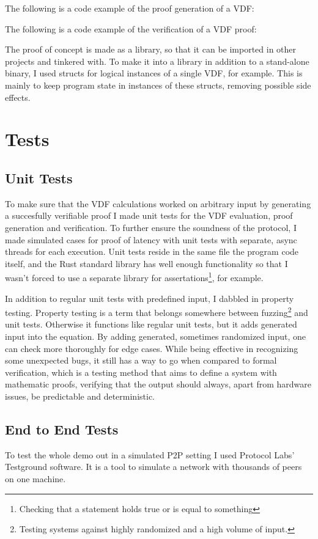 The following is a code example of the proof generation of a VDF:

The following is a code example of the verification of a VDF proof:

The proof of concept is made as a library, so that it can be imported in other projects and tinkered with. To make it into a library in addition to a stand-alone binary, I used structs for logical instances of a single VDF, for example. This is mainly to keep program state in instances of these structs, removing possible side effects.


\section{Tests}
\subsection{Unit Tests}
To make sure that the VDF calculations worked on arbitrary input by generating a succesfully verifiable proof I made unit tests for the VDF evaluation, proof generation and verification. To further ensure the soundness of the protocol, I made simulated cases for proof of latency with unit tests with separate, async threads for each execution. Unit tests reside in the same file the program code itself, and the Rust standard library has well enough functionality so that I wasn't forced to use a separate library for assertations\footnote{Checking that a statement holds true or is equal to something}, for example.

In addition to regular unit tests with predefined input, I dabbled in property testing. Property testing is a term that belongs somewhere between fuzzing\footnote{Testing systems against highly randomized and a high volume of input.} and unit tests. Otherwise it functions like regular unit tests, but it adds generated input into the equation. By adding generated, sometimes randomized input, one can check more thoroughly for edge cases. While being effective in recognizing some unexpected bugs, it still has a way to go when compared to formal verification, which is a testing method that aims to define a system with mathematic proofs, verifying that the output should always, apart from hardware issues, be predictable and deterministic.

\subsection{End to End Tests}
To test the whole demo out in a simulated P2P setting I used Protocol Labs' Testground software. It is a tool to simulate a network with thousands of peers on one machine.
